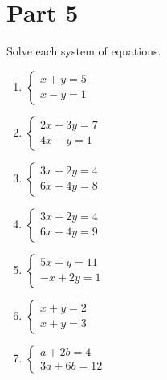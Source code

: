 \documentclass[10pt]{article}
\theoremstyle{definition}
\theoremstyle{plain}
\numberwithin{equation}{section}
\begin{document}
\newpage
\section*{Part 5}
\begin{multicolblock}{Solve each system of equations.}
\begin{enumerate}
  \item $\begin{cases} x + y = 5 \\[4pt] x - y = 1 \end{cases}$
  \item $\begin{cases} 2x + 3y = 7 \\[4pt] 4x - y = 1 \end{cases}$
  \item $\begin{cases} 3x - 2y = 4 \\[4pt] 6x - 4y = 8 \end{cases}$
  \item $\begin{cases} 3x - 2y = 4 \\[4pt] 6x - 4y = 9 \end{cases}$
  \item $\begin{cases} 5x + y = 11 \\[4pt] -x + 2y = 1 \end{cases}$
  \item $\begin{cases} x + y = 2 \\[4pt] x + y = 3 \end{cases}$
  \item $\begin{cases} a + 2b = 4 \\[4pt] 3a + 6b = 12 \end{cases}$
\end{enumerate}
\end{multicolblock}
\end{document}
